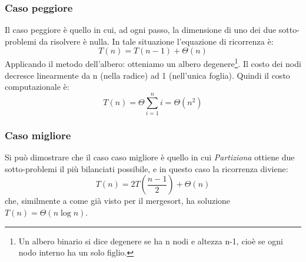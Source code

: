 \subsubsection{Caso peggiore}
Il caso peggiore è quello in cui, ad ogni passo, la dimensione di uno dei due sotto-problemi da risolvere è nulla. In tale situazione l’equazione di ricorrenza è:
\begin{equation*}T(n) = T(n - 1) + \Theta(n)\end{equation*}
Applicando il metodo dell'albero: otteniamo un albero degenere\footnote{Un albero binario si dice degenere se ha n nodi e altezza n-1, cioè se ogni nodo interno ha un solo figlio.}. Il costo dei nodi decresce linearmente da n (nella radice) ad 1 (nell'unica foglia). Quindi il costo computazionale è:
\begin{equation*}T(n)=\Theta\sum^n_{i=1}i=\Theta(n^2)\end{equation*}
\subsubsection{Caso migliore}
Si può dimostrare che il caso caso migliore è quello in cui \textit{Partiziona} ottiene due sotto-problemi il più bilanciati possibile, e in questo caso la ricorrenza diviene:
\begin{equation*}T(n)=2T(\frac{n-1}{2})+\Theta(n)\end{equation*} 
che, similmente a come già visto per il mergesort, ha soluzione $T(n) = \Theta(n\log n)$.
